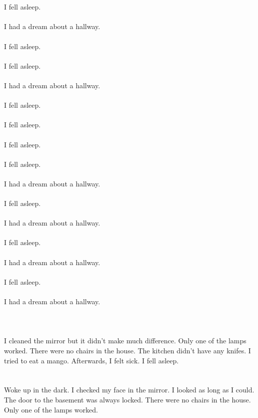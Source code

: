 \documentclass{article}
\begin{document}
    \section{}
    I fell asleep.\\\\I had a dream about a hallway.\\\\ I fell asleep.\\\\ I fell asleep.\\\\I had a dream about a hallway.\\\\ I fell asleep.\\\\ I fell asleep.\\\\ I fell asleep.\\\\ I fell asleep.\\\\I had a dream about a hallway.\\\\ I fell asleep.\\\\I had a dream about a hallway.\\\\ I fell asleep.\\\\I had a dream about a hallway.\\\\ I fell asleep.\\\\I had a dream about a hallway.\\\\ 
    \newpage
    
    \section{}
    I cleaned the mirror but it didn't make much difference. Only one of the lamps worked. There were no chairs in the house. The kitchen didn't have any knifes. I tried to eat a mango. Afterwards, I felt sick. I fell asleep.  
    \newpage
    
    \section{}
    Woke up in the dark. I checked my face in the mirror. I looked as long as I could. The door to the basement was always locked. There were no chairs in the house. Only one of the lamps worked.  
    \newpage
    
\end{document}
